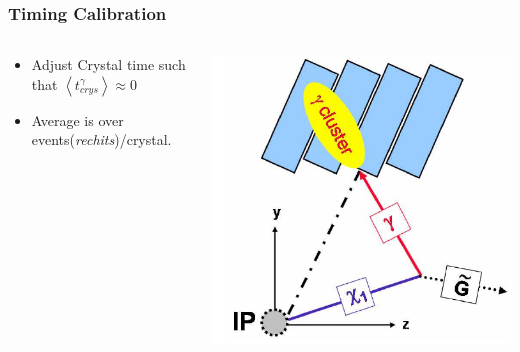 \documentclass{beamer}
\begin{document}
\begin{frame}
\frametitle{Timing Calibration}
\begin{minipage}[b]{0.85\paperwidth}
 \begin{tcolorbox}[colback=UNL@Cream!5,colframe=UNL@Cream!70,title=\textcolor{UMN@Maroon}{\textbf{Calibration Procedure}}] 
  \begin{columns}
   \begin{column}{0.55\linewidth}
    \begin{itemize}
      \item Adjust Crystal time such that $ \left\langle t^{\gamma}_{crys} \right\rangle \approx 0$
      \item Average is over events(\textit{rechits})/crystal.
    \end{itemize}
    \end{column}
    \begin{column}{0.65\linewidth}
     \includegraphics[height=0.35\textwidth, width=0.63\linewidth]{THESISPLOTS/TimeCalibIdea.png}
     

\end{column}
\end{columns}
\end{tcolorbox}
\end{minipage}
\end{frame}
\end{document}
